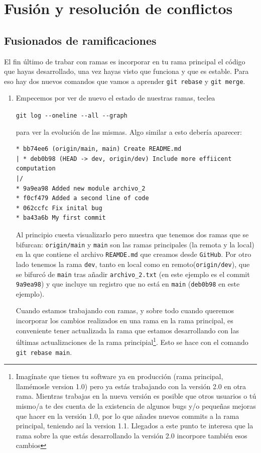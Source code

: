 \documentclass[a4paper,11pt]{report}
\newcommand{\cverb}{\Verb}
\begin{document}
  \chapter{Fusión y resolución de conflictos}
  \section{Fusionados de ramificaciones}
    El fin último de trabar con ramas es incorporar en tu rama principal el código que hayas desarrollado, una vez hayas visto que funciona y que es estable. Para eso hay dos nuevos comandos que vamos a aprender \cverb+git rebase+ y \cverb+git merge+.
    
    \begin{enumerate}
     \item Empecemos por ver de nuevo el estado de nuestras ramas, teclea
     
     \cverb+git log --oneline --all --graph+
     
     para ver la evolución de las mismas. Algo similar a esto debería aparecer:
     
     \begin{lstlisting}[style=custom]
* bb74ee6 (origin/main, main) Create README.md
| * deb0b98 (HEAD -> dev, origin/dev) Include more effiicent computation
|/  
* 9a9ea98 Added new module archivo_2
* f0cf479 Added a second line of code
* 062ccfc Fix inital bug
* ba43a6b My first commit
     \end{lstlisting}
    
    Al principio cuesta visualizarlo pero muestra que tenemos dos ramas que se bifurcan: \verb+origin/main+ y \verb+main+ son las ramas principales (la remota y la local) en la que contiene el archivo \verb+REAMDE.md+ que creamos desde \verb+GitHub+. Por otro lado tenemos la rama \verb+dev+, tanto en local como en remoto(\verb+origin/dev+), que se bifurcó de \verb+main+ tras añadir \verb+archivo_2.txt+ (en este ejemplo es el commit \verb+9a9ea98+) y que incluye un registro que no está en \verb+main+ (\verb+deb0b98+ en este ejemplo).
    
    Cuando estamos trabajando con ramas, y sobre todo cuando queremos incorporar los cambios realizados en una rama en la rama principal, es conveniente tener actualizada la rama que estamos desarrollando con las últimas actualizaciones de la rama principial\footnote{Imagínate que tienes tu software ya en producción (rama principal, llamémosle version 1.0) pero ya estás trabajando con la versión 2.0 en otra rama. Mientras trabajas en la nueva versión es posible que otros usuarios o tú mismo/a te des cuenta de la existencia de algunos bugs y/o pequeñas mejoras que hacer en la versión 1.0, por lo que añades nuevos commits a la rama principal, teniendo así la version 1.1. Llegados a este punto te interesa que la rama sobre la que estás desarrollando la versión 2.0 incorpore también esos cambios}. Esto se hace con el comando \cverb+git rebase main+.
    

\end{enumerate}
\end{document}
